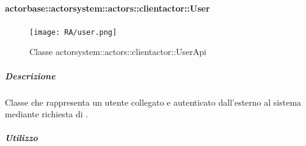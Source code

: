 \documentclass{scalatekids-article}
\begin{document}




\paragraph{actorbase::actorsystem::actors::clientactor::User}
\label{sec:actorbase::actorsystem::actors::clientactor::User}

\begin{figure}[H]
  \begin{center}
    \texttt{[image: RA/user.png]}
    \caption{Classe actorsystem::actors::clientactor::UserApi}
  \end{center}
\end{figure}

\subparagraph{Descrizione}

Classe che rappresenta un utente collegato e autenticato dall'esterno al sistema
mediante richiesta di .

\subparagraph{Utilizzo}
\end{document}
